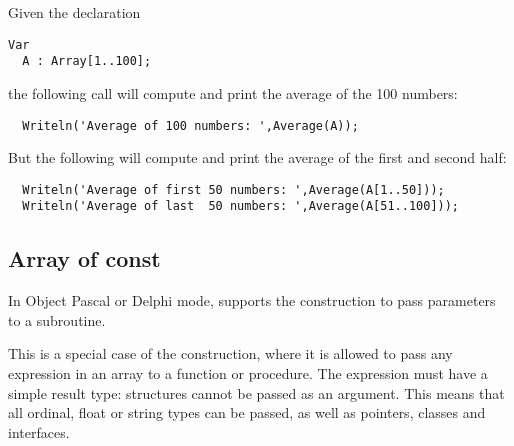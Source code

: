 Given the declaration
\begin{verbatim}
Var
  A : Array[1..100];
\end{verbatim}
the following call will compute and print the average of the 100 numbers:
\begin{verbatim}
  Writeln('Average of 100 numbers: ',Average(A));
\end{verbatim}
But the following will compute and print the average of the first and second
half:
\begin{verbatim}
  Writeln('Average of first 50 numbers: ',Average(A[1..50]));
  Writeln('Average of last  50 numbers: ',Average(A[51..100]));
\end{verbatim} 

\subsection{Array of const}
In Object Pascal or Delphi mode, \fpc supports the 
construction to pass parameters to a subroutine.

This is a special case of the  construction, where it is
allowed to pass any expression in an array to a function or procedure. 
The expression must have a simple result type: structures cannot be passed
as an argument. This means that all ordinal, float or string types can be
passed, as well as pointers, classes and interfaces.

